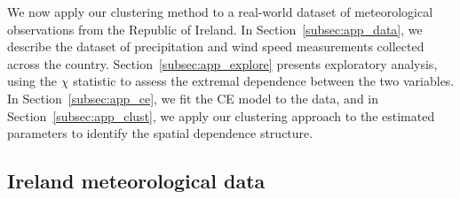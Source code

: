 \documentclass[
  12pt]{article}
\begin{document}

We now apply our clustering method to a real-world dataset of meteorological observations from the Republic of Ireland. 
In Section~\ref{subsec:app_data}, we describe the dataset of precipitation and wind speed measurements collected across the country. 
Section~\ref{subsec:app_explore} presents exploratory analysis, using the $\chi$ statistic to assess the extremal dependence between the two variables. 
In Section~\ref{subsec:app_ce}, we fit the CE model to the data, and in Section~\ref{subsec:app_clust}, we apply our clustering approach to the estimated parameters to identify the spatial dependence structure. 

\subsection{Ireland meteorological data}~\label{subsec:app_data}

\end{document}
